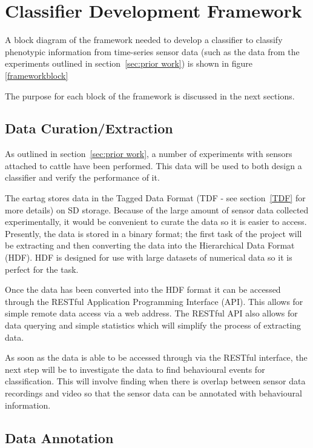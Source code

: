 \section{Classifier Development Framework }

A block diagram of the framework needed to develop a classifier to classify phenotypic information from time-series sensor data (such as the data from the experiments outlined in section~\ref{sec:prior work}) is shown in figure \ref{frameworkblock}


The purpose for each block of the framework is discussed in the next sections.


\subsection{Data Curation/Extraction}
As outlined in  section~\ref{sec:prior work}, a number of experiments with sensors attached to cattle have been performed. This data will be used to both design a classifier and verify the performance of it. 

The eartag stores data in the Tagged Data Format (TDF - see section~\ref{TDF} for more details) on SD storage. Because of the large amount of sensor data collected experimentally, it would be convenient to curate the data so it is easier to access. Presently, the data is stored in a binary format; the first task of the project will be extracting and then converting the data into the Hierarchical Data Format (HDF). HDF is designed for use with large datasets of numerical data so it is perfect for the task.

Once the data has been converted into the HDF format it can be accessed through the RESTful Application Programming Interface (API). This allows for simple remote data access via a web address. The RESTful API also allows for data querying and simple statistics which will simplify the process of extracting data.

As soon as the data is able to be accessed through via the RESTful interface, the next step will be to investigate the data to find behavioural events for classification. This will involve finding when there is overlap between sensor data recordings and video so that the sensor data can be annotated with behavioural information.

\subsection{Data Annotation}

